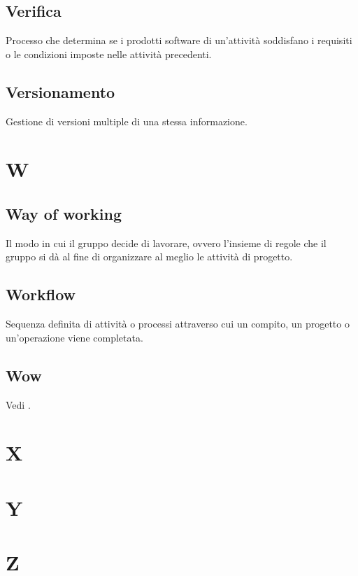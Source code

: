     \subsection{Verifica}
    Processo che determina se i prodotti software di un'attività soddisfano
    i requisiti o le condizioni imposte nelle attività precedenti.
    \subsection{Versionamento}
    Gestione di versioni multiple di una stessa informazione.
\pagebreak
\section{W}
    \subsection{Way of working}
    \label{Way of working}
    Il modo in cui il gruppo decide di lavorare, ovvero l'insieme di regole 
    che il gruppo si dà al fine di organizzare al meglio le attività di progetto.
    \subsection{Workflow}
    Sequenza definita di attività o processi attraverso cui un compito, un progetto 
    o un'operazione viene completata.
    \subsection{Wow}
    Vedi .
\pagebreak
\section{X}
\pagebreak
\section{Y}
\pagebreak
\section{Z}
